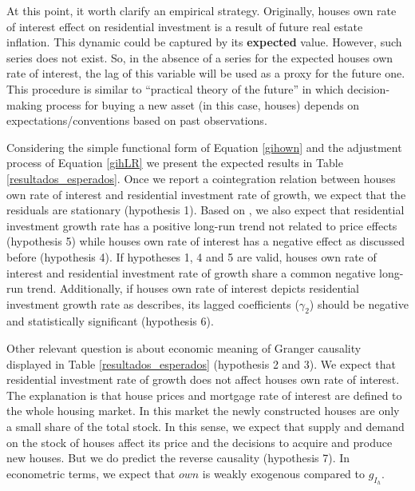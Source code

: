 \documentclass[12pt, a4paper]{article}
\begin{document}
At this point, it worth clarify an empirical strategy.
Originally, houses own rate of interest effect on residential investment  is a result of future real estate inflation.
This dynamic could be captured by its \textbf{expected} value.
However, such series does not exist.
So, in the absence of a series for the expected houses own rate of interest, the lag of this variable will be used as a proxy for the future one.
This procedure is similar to \textcite{keynes_general_1937} ``practical theory of the future'' in which decision-making process for buying a new asset (in this case, houses) depends on expectations/conventions based on past observations.

Considering the simple functional form of Equation \ref{gihown} and the adjustment process of Equation \ref{gihLR} we present the expected results in Table \ref{resultados_esperados}.
Once we report a cointegration relation between houses own rate of interest and residential investment rate of growth, we expect that the residuals are stationary (hypothesis 1).
Based on \textcite{teixeira_crescimento_2015}, we also expect that residential investment growth rate has a positive long-run trend not related to price effects (hypothesis 5) while houses own rate of interest has a negative effect as discussed before (hypothesis 4).
If  hypotheses 1, 4 and 5 are valid, houses own rate of interest and residential investment rate of growth share a common negative long-run trend.
Additionally, if houses own rate of interest depicts residential investment growth rate as \textcite{teixeira_crescimento_2015} describes, its lagged coefficients (\(\gamma_{2}\)) should be negative and statistically significant (hypothesis 6).






Other relevant question is about economic meaning of Granger causality displayed in Table \ref{resultados_esperados} (hypothesis 2 and 3).
We expect that residential investment rate of growth does not affect  houses own rate of interest.
The explanation is that house prices and mortgage rate of interest are defined to the whole housing market.
In this market the newly constructed houses are only a small share of the total stock.
In this sense, we expect that supply and demand on the stock of houses affect its price and the decisions to acquire and produce new houses.
But we do predict the reverse causality (hypothesis 7).
In econometric terms, we expect that \(own\) is weakly exogenous compared to \(g_{I_{h}}\).
\end{document}
